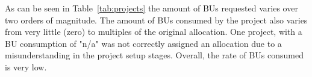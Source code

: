 As can be seen in Table~\ref{tab:projects} the amount of BUs requested varies over two orders of magnitude.
The amount of BUs consumed by the project also varies from very little (zero) to multiples of the original allocation.
One project, with a BU consumption of "n/a" was not correctly assigned an allocation due to a misunderstanding in the project setup stages.
Overall, the rate of BUs consumed is very low.

